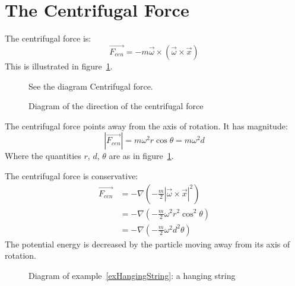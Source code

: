\documentclass[../Main.tex]{subfiles}
\begin{document}
\section{The Centrifugal Force}
The centrifugal force is:
\begin{equation}
    \vec{F_{cen}} = -m \vec{\omega} \times (\vec{\omega} \times \vec{x})
    \label{eqnCentrifugal}
\end{equation}
This is illustrated in figure~\ref{figCentrifugal}.
\begin{figure}[ht]
    \centering
    See the diagram Centrifugal force. %
    \caption{Diagram of the direction of the centrifugal force}
    \label{figCentrifugal}
\end{figure}
The centrifugal force points away from the axis of rotation. It has magnitude:
\begin{equation*}
    |\vec{F_{cen}}| = m\omega^2 r \cos{\theta} = m\omega^2d
\end{equation*}
Where the quantities $r$, $d$, $\theta$ are as in figure~\ref{figCentrifugal}.\par
The centrifugal force is conservative:
\begin{align*}
    \vec{F_{cen}} &= -\nabla\left(-\frac{m}{2}|\vec{\omega} \times \vec{x}|^2\right) \\
    &= -\nabla\left(-\frac{m}{2}\omega^2r^2\cos^2\theta\right) \\
    &= -\nabla\left(-\frac{m}{2}\omega^2d^2\theta\right)
\end{align*}
The potential energy is decreased by the particle moving away from its axis of rotation.
\begin{figure}[ht]
    \centering
    \caption{Diagram of example~\ref{exHangingString}: a hanging string}
    \label{figHangingString}
\end{figure}
\end{document}
